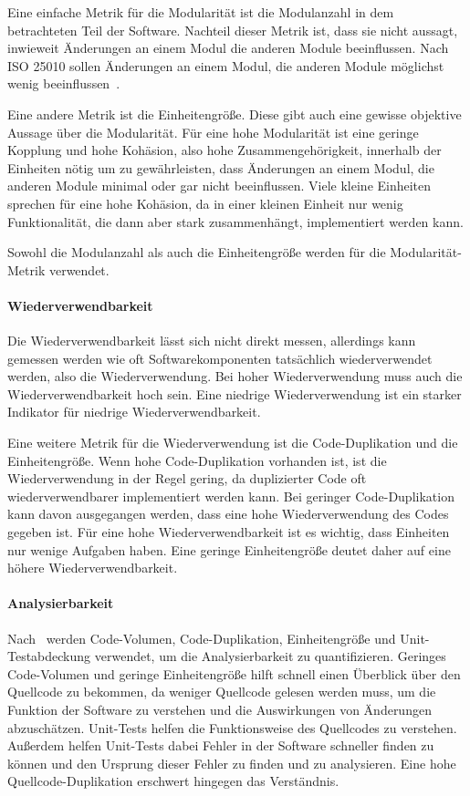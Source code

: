 \documentclass[12pt, a4paper, ngerman]{article}
\begin{document}
Eine einfache Metrik für die Modularität ist die Modulanzahl
in dem betrachteten Teil der Software.
Nachteil dieser Metrik ist, dass sie nicht aussagt,
inwieweit Änderungen an einem Modul die anderen Module beeinflussen.
Nach ISO 25010 sollen Änderungen an einem Modul,
die anderen Module möglichst wenig beeinflussen~\cite{ISO25010}.

Eine andere Metrik ist die Einheitengröße.
Diese gibt auch eine gewisse objektive Aussage über die Modularität.
Für eine hohe Modularität ist eine geringe Kopplung und
hohe Kohäsion, also hohe Zusammengehörigkeit, innerhalb der Einheiten nötig um zu gewährleisten,
dass Änderungen an einem Modul, die anderen Module minimal oder gar nicht beeinflussen.
Viele kleine Einheiten sprechen für eine hohe Kohäsion,
da in einer kleinen Einheit nur wenig Funktionalität,
die dann aber stark zusammenhängt, implementiert werden kann.

Sowohl die Modulanzahl als auch die Einheitengröße werden
für die Modularität-Metrik verwendet.

\paragraph{Wiederverwendbarkeit}

Die Wiederverwendbarkeit lässt sich nicht direkt messen,
allerdings kann gemessen werden wie oft Softwarekomponenten
tatsächlich wiederverwendet werden, also die Wiederverwendung.
Bei hoher Wiederverwendung muss auch die Wiederverwendbarkeit hoch sein.
Eine niedrige Wiederverwendung ist ein starker Indikator für niedrige Wiederverwendbarkeit.

Eine weitere Metrik für die Wiederverwendung ist die Code-Duplikation und die Einheitengröße.
Wenn hohe Code-Duplikation vorhanden ist, ist die Wiederverwendung in der Regel gering,
da duplizierter Code oft wiederverwendbarer implementiert werden kann.
Bei geringer Code-Duplikation kann davon ausgegangen werden,
dass eine hohe Wiederverwendung des Codes gegeben ist.
Für eine hohe Wiederverwendbarkeit ist es wichtig,
dass Einheiten nur wenige Aufgaben haben.
Eine geringe Einheitengröße deutet daher auf eine höhere Wiederverwendbarkeit.

\paragraph{Analysierbarkeit}

Nach~\cite{maintainability_metrics} werden Code-Volumen, Code-Duplikation, Einheitengröße
und Unit-Testabdeckung verwendet, um die Analysierbarkeit zu quantifizieren.
Geringes Code-Volumen und geringe Einheitengröße hilft
schnell einen Überblick über den Quellcode zu bekommen,
da weniger Quellcode gelesen werden muss, um die Funktion der Software zu verstehen
und die Auswirkungen von Änderungen abzuschätzen.
Unit-Tests helfen die Funktionsweise des Quellcodes zu verstehen.
Außerdem helfen Unit-Tests dabei Fehler in der Software schneller finden zu können
und den Ursprung dieser Fehler zu finden und zu analysieren.
Eine hohe Quellcode-Duplikation erschwert hingegen das Verständnis.
\end{document}
